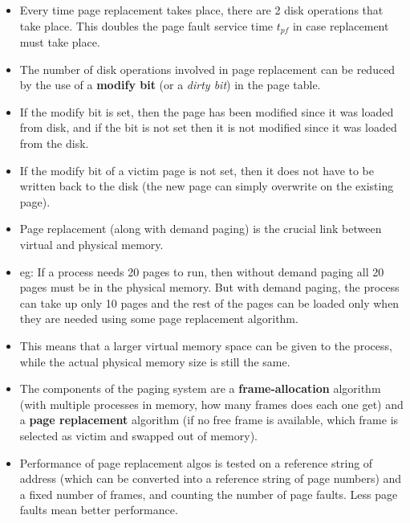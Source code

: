 \documentclass{article}
\theoremstyle{plain}
\theoremstyle{definition}
\begin{document}
\begin{itemize}
    \item Every time page replacement takes place, there are 2 disk operations that take place. This doubles the page fault service time $t_{pf}$ in case replacement must take place. 
    
    \item The number of disk operations involved in page replacement can be reduced by the use of a \textbf{modify bit} (or a \textit{dirty bit}) in the page table.
    
    \item If the modify bit is set, then the page has been modified since it was loaded from disk, and if the bit is not set then it is not modified since it was loaded from the disk.
    
    \item If the modify bit of a victim page is not set, then it does not have to be written back to the disk (the new page can simply overwrite on the existing page). 
    
    \item Page replacement (along with demand paging) is the crucial link between virtual and physical memory. 
    
    \item eg: If a process needs 20 pages to run, then without demand paging all 20 pages must be in the physical memory. But with demand paging, the process can take up only 10 pages and the rest of the pages can be loaded only when they are needed using some page replacement algorithm.
    
    \item This means that a larger virtual memory space can be given to the process, while the actual physical memory size is still the same. 
    
    \item The components of the paging system are a \textbf{frame-allocation} algorithm (with multiple processes in memory, how many frames does each one get) and a \textbf{page replacement} algorithm (if no free frame is available, which frame is selected as victim and swapped out of memory).
    
    \item Performance of page replacement algos is tested on a reference string of address (which can be converted into a reference string of page numbers) and a fixed number of frames, and counting the number of page faults. Less page faults mean better performance.
\end{itemize}
\end{document}
